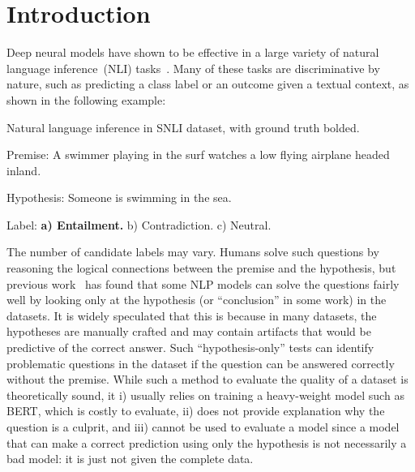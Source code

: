 \section{Introduction}
\label{sec:intro}
Deep neural models have shown to be effective in 
a large variety of natural language inference~(NLI)
tasks~\cite{bowman2015large,wang2018glue,mostafazadeh2016corpus,roemmele2011choice,zellers2018swag}. Many of these tasks
are discriminative by nature, such as predicting a class label or
an outcome given a textual context, as shown in the following example:

\begin{example}\label{exp:snli}
Natural language inference in SNLI dataset, with ground truth bolded.
\begin{description}
\item{Premise:} A swimmer playing in the surf watches a low flying airplane headed inland. 
\item{Hypothesis:} Someone is swimming in the sea.
\item{Label:} \textbf{a) Entailment.} b) Contradiction.  c) Neutral.
\end{description}
\end{example}

The number of candidate labels may vary. Humans solve such questions by
reasoning the logical connections between the premise and the hypothesis,
but previous work~\cite{naik2018stress,schuster2019towards} 
has found that some NLP models can solve the questions
fairly well by looking only at the hypothesis (or ``conclusion'' in some work)
in the datasets.
It is widely speculated that this is because in many datasets, 
the hypotheses are manually crafted and may contain artifacts that
would be predictive of the correct answer. 
Such ``hypothesis-only'' tests can identify problematic questions
in the dataset if the question can be answered correctly without 
the premise. While such a method to evaluate the quality of
a dataset is theoretically sound, 
it i) usually relies on training a heavy-weight model such as BERT, which
is costly to evaluate, ii) does not provide explanation why the question is 
a culprit, and iii) cannot be used to evaluate a model since a model that
can make a correct prediction using only the hypothesis is not necessarily a
bad model: it is just not given the complete data.  



